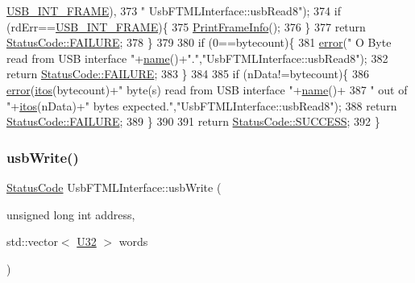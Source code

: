 \begin{DoxyCode}
      \hyperlink{LALUsbML_8h_a68260f9cf3649507d12904cfa1592c11afd1c409187b1dfd3d66887a5e07e7ed3}{USB\_INT\_FRAME}),
373             \textcolor{stringliteral}{" UsbFTMLInterface::usbRead8"});
374     \textcolor{keywordflow}{if} (rdErr==\hyperlink{LALUsbML_8h_a68260f9cf3649507d12904cfa1592c11afd1c409187b1dfd3d66887a5e07e7ed3}{USB\_INT\_FRAME})\{
375       \hyperlink{LALUsbML_8h_ab3398c17204ba7fb4b47eb9bbf4ba94e}{PrintFrameInfo}();
376     \} 
377     \textcolor{keywordflow}{return} \hyperlink{classStatusCode_a6f565cbeadc76d14c72f047e5e85eb4ba3da73d4c469762eb9d3c960368252b26}{StatusCode::FAILURE};
378   \}
379   
380   \textcolor{keywordflow}{if} (0==bytecount)\{
381     \hyperlink{classObject_a204a95f57818c0f811933917a30eff45}{error}(\textcolor{stringliteral}{" O Byte read from USB interface "}+\hyperlink{classObject_a300f4c05dd468c7bb8b3c968868443c1}{name}()+\textcolor{stringliteral}{"."},\textcolor{stringliteral}{"UsbFTMLInterface::usbRead8"});
382     \textcolor{keywordflow}{return} \hyperlink{classStatusCode_a6f565cbeadc76d14c72f047e5e85eb4ba3da73d4c469762eb9d3c960368252b26}{StatusCode::FAILURE};
383   \}
384 
385   \textcolor{keywordflow}{if} (nData!=bytecount)\{
386     \hyperlink{classObject_a204a95f57818c0f811933917a30eff45}{error}(\hyperlink{Tools_8h_af330027dbdafb9a30768b3613c553e60}{itos}(bytecount)+\textcolor{stringliteral}{" byte(s) read from USB interface "}+\hyperlink{classObject_a300f4c05dd468c7bb8b3c968868443c1}{name}()+
387             \textcolor{stringliteral}{" out of "}+\hyperlink{Tools_8h_af330027dbdafb9a30768b3613c553e60}{itos}(nData)+\textcolor{stringliteral}{" bytes expected."},\textcolor{stringliteral}{"UsbFTMLInterface::usbRead8"});
388     \textcolor{keywordflow}{return} \hyperlink{classStatusCode_a6f565cbeadc76d14c72f047e5e85eb4ba3da73d4c469762eb9d3c960368252b26}{StatusCode::FAILURE};    
389   \}
390 
391   \textcolor{keywordflow}{return} \hyperlink{classStatusCode_a6f565cbeadc76d14c72f047e5e85eb4badd0da38d3ba0d922efd1f4619bc37ad8}{StatusCode::SUCCESS};
392 \}
\end{DoxyCode}
\mbox{\label{classUsbFTMLInterface_a24eed1c8e7ba38e8a997aeff8b0e0a51}} 
\subsubsection{\texorpdfstring{usb\+Write()}{usbWrite()}}
{\footnotesize\ttfamily \hyperlink{classStatusCode}{Status\+Code} Usb\+F\+T\+M\+L\+Interface\+::usb\+Write (\begin{DoxyParamCaption}\item[{unsigned long int}]{address,  }\item[{std\+::vector$<$ \hyperlink{classUsbFTMLInterface_a142f8ce4b5873c295af8945f3894ae38}{U32} $>$}]{words }\end{DoxyParamCaption})}

